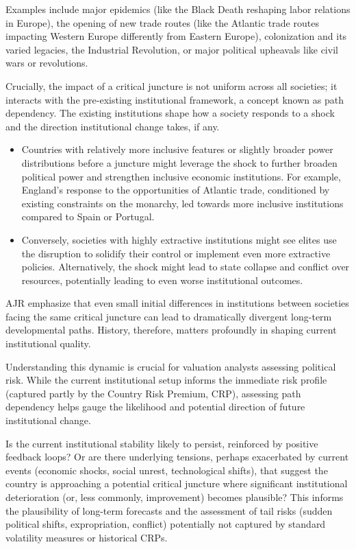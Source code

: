 Examples include major epidemics (like the Black Death reshaping labor relations in Europe), the opening of new trade routes (like the Atlantic trade routes impacting Western Europe differently from Eastern Europe), colonization and its varied legacies, the Industrial Revolution, or major political upheavals like civil wars or revolutions.

Crucially, the impact of a critical juncture is not uniform across all societies; it interacts with the pre-existing institutional framework, a concept known as path dependency. The existing institutions shape how a society responds to a shock and the direction institutional change takes, if any.
\begin{itemize}
    \item Countries with relatively more inclusive features or slightly broader power distributions before a juncture might leverage the shock to further broaden political power and strengthen inclusive economic institutions. For example, England's response to the opportunities of Atlantic trade, conditioned by existing constraints on the monarchy, led towards more inclusive institutions compared to Spain or Portugal.
    \item Conversely, societies with highly extractive institutions might see elites use the disruption to solidify their control or implement even more extractive policies. Alternatively, the shock might lead to state collapse and conflict over resources, potentially leading to even worse institutional outcomes.
\end{itemize}
AJR emphasize that even small initial differences in institutions between societies facing the same critical juncture can lead to dramatically divergent long-term developmental paths. History, therefore, matters profoundly in shaping current institutional quality.

Understanding this dynamic is crucial for valuation analysts assessing political risk. While the current institutional setup informs the immediate risk profile (captured partly by the Country Risk Premium, CRP), assessing path dependency helps gauge the likelihood and potential direction of future institutional change. 

Is the current institutional stability likely to persist, reinforced by positive feedback loops? Or are there underlying tensions, perhaps exacerbated by current events (economic shocks, social unrest, technological shifts), that suggest the country is approaching a potential critical juncture where significant institutional deterioration (or, less commonly, improvement) becomes plausible? This informs the plausibility of long-term forecasts and the assessment of tail risks (sudden political shifts, expropriation, conflict) potentially not captured by standard volatility measures or historical CRPs. 

